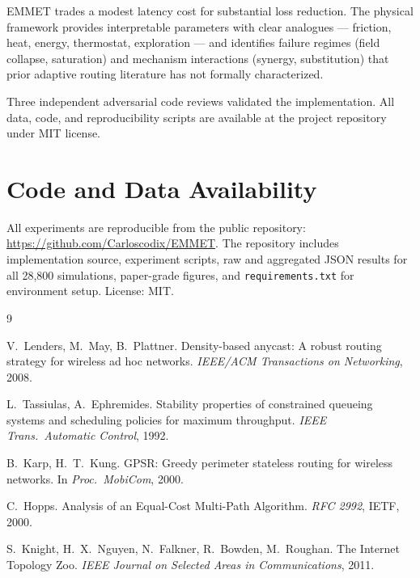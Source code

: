 \documentclass[11pt,a4paper]{article}
\begin{document}
EMMET trades a modest latency cost for substantial loss reduction.
The physical framework provides interpretable parameters with clear
analogues --- friction, heat, energy, thermostat, exploration --- and
identifies failure regimes (field collapse, saturation) and mechanism
interactions (synergy, substitution) that prior adaptive routing
literature has not formally characterized.

Three independent adversarial code reviews validated the
implementation. All data, code, and reproducibility scripts are
available at the project repository under MIT license.

\section*{Code and Data Availability}

All experiments are reproducible from the public repository:
\url{https://github.com/Carloscodix/EMMET}. The repository includes
implementation source, experiment scripts, raw and aggregated JSON
results for all 28{,}800 simulations, paper-grade figures, and
\texttt{requirements.txt} for environment setup. License: MIT.

\begin{thebibliography}{9}

V.~Lenders, M.~May, B.~Plattner.
\newblock Density-based anycast: A robust routing strategy for wireless
  ad hoc networks.
\newblock \textit{IEEE/ACM Transactions on Networking}, 2008.

L.~Tassiulas, A.~Ephremides.
\newblock Stability properties of constrained queueing systems and
  scheduling policies for maximum throughput.
\newblock \textit{IEEE Trans.\ Automatic Control}, 1992.

B.~Karp, H.~T.~Kung.
\newblock GPSR: Greedy perimeter stateless routing for wireless
  networks.
\newblock In \textit{Proc.\ MobiCom}, 2000.

C.~Hopps.
\newblock Analysis of an Equal-Cost Multi-Path Algorithm.
\newblock \textit{RFC 2992}, IETF, 2000.

S.~Knight, H.~X.~Nguyen, N.~Falkner, R.~Bowden, M.~Roughan.
\newblock The Internet Topology Zoo.
\newblock \textit{IEEE Journal on Selected Areas in Communications},
  2011.

\end{thebibliography}
\end{document}
